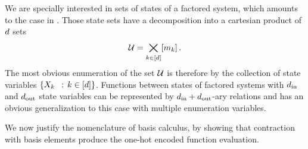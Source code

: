We are specially interested in sets of states of a factored system, which amounts to the case in .
Those state sets have a decomposition into a cartesian product of $d$ sets
	\[ \mathcal{U} = \bigtimes_{k\in[d]}[m_{k}] \, . \]
The most obvious enumeration of the set $\mathcal{U}$ is therefore by the collection of state variables $\{\catvariableof{\atomenumerator} \, : \, \atomenumeratorin \}$.
Functions between states of factored systems with $d_{\mathrm{in}}$ and $d_{\mathrm{out}}$ state variables can be represented by $d_{\mathrm{in}}+d_{\mathrm{out}}$-ary relations and  has an obvious generalization to this case with multiple enumeration variables.

%
%


We now justify the nomenclature of basis calculus, by showing that contraction with basis elements produce the one-hot encoded function evaluation.

